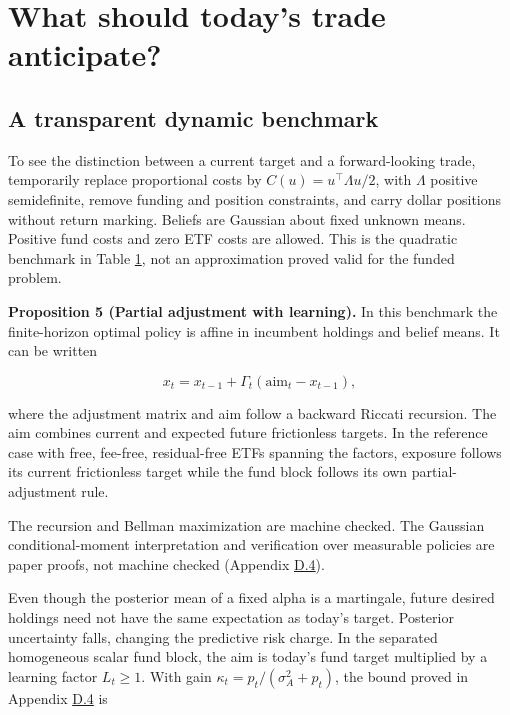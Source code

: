 \documentclass[11pt]{article}
\begin{document}
\section{What should today's trade anticipate?}\label{sec:4}

\subsection{A transparent dynamic benchmark}\label{sec:4.1}

To see the distinction between a current target and a forward-looking trade, temporarily replace proportional costs by \(C(u)=u^\top\Lambda u/2\), with \(\Lambda\) positive semidefinite, remove funding and position constraints, and carry dollar positions without return marking. Beliefs are Gaussian about fixed unknown means. Positive fund costs and zero ETF costs are allowed. This is the quadratic benchmark in Table \hyperref[tab:1]{1}, not an approximation proved valid for the funded problem.

\label{res:Proposition-5}
\textbf{Proposition 5 (Partial adjustment with learning).} In this benchmark the finite-horizon optimal policy is affine in incumbent holdings and belief means. It can be written

\begin{equation*}
x_t=x_{t-1}+\Gamma_t(\mathrm{aim}_t-x_{t-1}),
\tag{18}\label{eq:18}
\end{equation*}

where the adjustment matrix and aim follow a backward Riccati recursion. The aim combines current and expected future frictionless targets. In the reference case with free, fee-free, residual-free ETFs spanning the factors, exposure follows its current frictionless target while the fund block follows its own partial-adjustment rule.

The recursion and Bellman maximization are machine checked. The Gaussian conditional-moment interpretation and verification over measurable policies are paper proofs, not machine checked (Appendix \hyperref[sec:D.4]{D.4}).

Even though the posterior mean of a fixed alpha is a martingale, future desired holdings need not have the same expectation as today's target. Posterior uncertainty falls, changing the predictive risk charge. In the separated homogeneous scalar fund block, the aim is today's fund target multiplied by a learning factor \(L_t\geq1\). With gain \(\kappa_t=p_t/(\sigma_A^2+p_t)\), the bound proved in Appendix \hyperref[sec:D.4]{D.4} is
\end{document}
